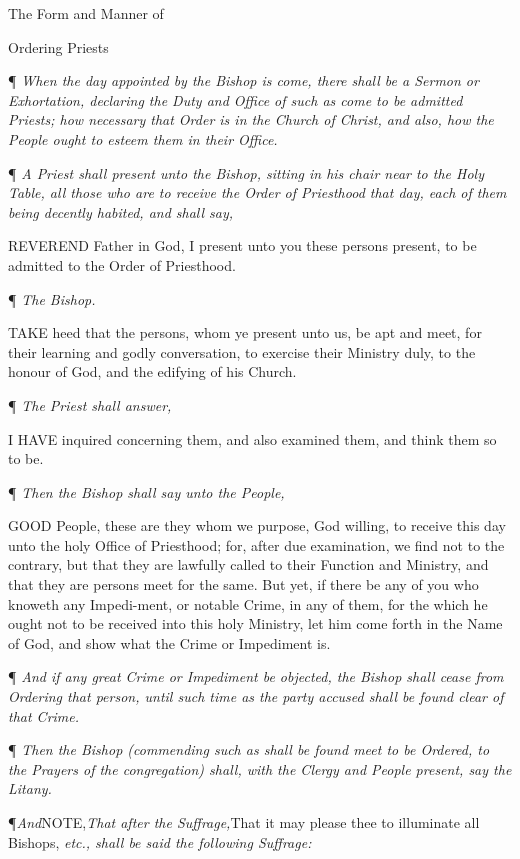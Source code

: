 \emph{}

The
Form and Manner of

Ordering
Priests

¶
\emph{When the day appointed by the Bishop is come, there shall be a Sermon
or Exhortation, declaring the Duty and Office of such as come to be
admitted Priests; how necessary that Order is in the Church of Christ,
and also, how the People ought to esteem them in their Office.}

¶ \emph{A Priest shall present unto the Bishop, sitting in his chair
near to the Holy Table, all those who are to receive the Order of Priesthood
that day, each of them being decently habited, and shall say,}

REVEREND
Father in God, I present unto you these persons present, to be admitted
to the Order of Priesthood.

¶
\emph{The Bishop.}

TAKE
heed that the persons, whom ye present unto us, be apt and meet, for
their learning and godly conversation, to exercise their Ministry duly,
to the honour of God, and the edifying of his Church.

¶
\emph{The Priest shall answer,}

I
HAVE inquired concerning them, and also examined them, and think them
so to be.

¶
\emph{Then the Bishop shall say unto the People,}

GOOD
People, these are they whom we purpose, God willing, to receive this
day unto the holy Office of Priesthood; for, after due examination,
we find not to the contrary, but that they are lawfully called to their
Function and Ministry, and that they are persons meet for the same.
But yet, if there be any of you who knoweth any Impedi-ment, or notable
Crime, in any of them, for the which he ought not to be received into
this holy Ministry, let him come forth in the Name of God, and show
what the Crime or Impediment is.

¶
\emph{And if any great Crime or Impediment be objected, the Bishop shall
cease from Ordering that person, until such time as the party accused
shall be found clear of that Crime.}

¶ \emph{Then the Bishop (commending such as shall be found meet to
be Ordered, to the Prayers of the congregation) shall, with the Clergy
and People present, say the Litany.}

¶\emph{And}NOTE,\emph{That after the
Suffrage,}That it may please thee to illuminate all Bishops, \emph{etc.,
shall be said the following Suffrage:}


